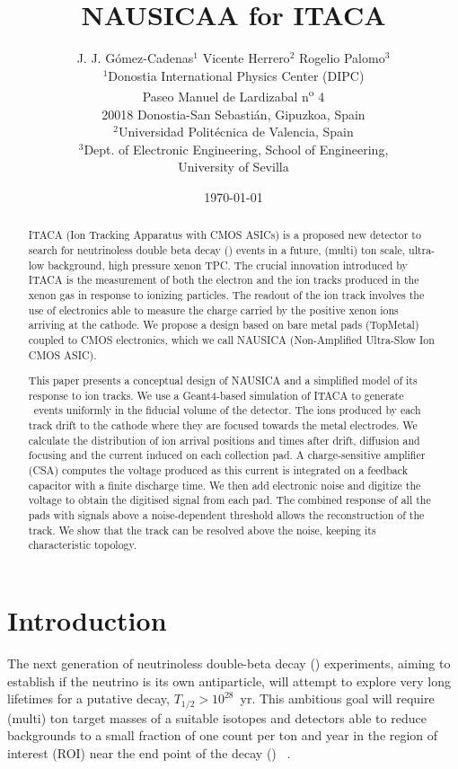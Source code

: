 \documentclass[11pt,a4paper]{article}
\title{NAUSICAA for ITACA}
\author{J. J. G\'omez-Cadenas$^{1}$ \quad Vicente Herrero$^{2}$ \quad Rogelio Palomo$^{3}$\\[5pt]
 {\small $^{1}$Donostia International Physics Center (DIPC)}\\
 {\small Paseo Manuel de Lardizabal n\textsuperscript{o} 4}\\
 {\small 20018 Donostia-San Sebasti\'an, Gipuzkoa, Spain}\\[3pt]
 {\small $^{2}$Universidad Polit\'ecnica de Valencia, Spain}\\[3pt]
 {\small $^{3}$Dept. of Electronic Engineering, School of Engineering,}\\
 {\small University of Sevilla}}
\date{\today}
\begin{document}
\maketitle
\thispagestyle{fancy}
\begin{abstract}
ITACA (Ion Tracking Apparatus with CMOS ASICs) is a proposed new detector to search for neutrinoless double beta decay (\bbonu) events in a future, (multi) ton scale, ultra-low background, high pressure xenon TPC. The crucial innovation introduced by ITACA is the measurement of both the electron and the ion tracks produced in the xenon gas in response to ionizing particles. The readout of the ion track involves the use of electronics able to measure the charge carried by the positive xenon ions arriving at the cathode. We propose a design based on bare metal pads (TopMetal) coupled to CMOS electronics, which we call NAUSICA (Non-Amplified Ultra-Slow Ion CMOS ASIC). 

This paper presents a conceptual design of NAUSICA and a simplified model of its response to ion tracks. We use a Geant4-based simulation of ITACA to generate \bbonu\ events uniformly in the fiducial volume of the detector. The ions produced by each track drift to the cathode where they are focused towards the metal electrodes. We calculate the distribution of ion arrival positions and times after drift, diffusion and focusing and the current induced on each collection pad. A charge-sensitive amplifier (CSA) computes the voltage produced as this current is integrated on a feedback capacitor with a finite discharge time. We then add electronic noise and digitize the voltage to obtain the digitised signal from each pad. The combined response of all the pads with signals above a noise-dependent threshold allows the reconstruction of the track. We show that the track can be
resolved above the noise, keeping its characteristic topology.

\end{abstract}

\section{Introduction}

The next generation of neutrinoless double-beta decay (\bbonu) experiments, aiming to establish if the neutrino is its own antiparticle, will attempt to explore very long lifetimes for a putative decay, $T_{1/2} > 10^{28}$~yr. This ambitious goal will require (multi) ton target masses of a suitable isotopes and detectors able to reduce backgrounds to a small fraction of one count per ton and year in the region of interest (ROI) near the end point of the decay (\Qbb) ~\cite{Gomez-Cadenas:2023vca}. 
\end{document}
